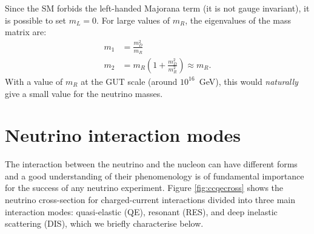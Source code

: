 Since the SM forbids the left-handed Majorana term (it is not gauge invariant), it is possible to set $m_L=0$. For large values of $m_R$, the eigenvalues of the mass matrix are:
\begin{align}
    m_1 & = \frac{m_D^2}{m_R} \\
    m_2 & = m_R \left(1+\frac{m_D^2}{m_R^2}\right) \approx m_R.
\end{align}
With a value of $m_R$ at the GUT scale (around $10^{16}$~GeV), this would \emph{naturally} give a small value for the neutrino masses. 



\section{Neutrino interaction modes}\label{sec:modes}
The interaction between the neutrino and the nucleon can have different forms and a good understanding of their phenomenology is of fundamental importance for the success of any neutrino experiment.
Figure \ref{fig:ccqecross} shows the neutrino cross-section for charged-current interactions divided into three main interaction modes: quasi-elastic (QE), resonant (RES), and deep inelastic scattering (DIS), which we briefly characterise below. 

